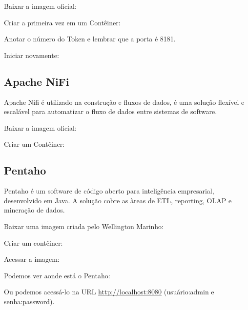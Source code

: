\documentclass[a4paper,11pt]{article}
\begin{document}
Baixar a imagem oficial: \\

Criar a primeira vez em um Contêiner: \\

Anotar o número do Token e lembrar que a porta é 8181. 

Iniciar novamente: \\

\subsection{Apache NiFi}
Apache Nifi é utilizado na construção e fluxos de dados, é uma solução flexível e escalável para automatizar o fluxo de dados entre sistemas de software. 

Baixar a imagem oficial: \\

Criar um Contêiner: \\

\subsection{Pentaho}
Pentaho é um software de código aberto para inteligência empresarial, desenvolvido em Java. A solução cobre as àreas de ETL, reporting, OLAP e mineração de dados. 

Baixar uma imagem criada pelo Wellington Marinho: \\

Criar um contêiner: \\

Acessar a imagem: \\

Podemos ver aonde está o Pentaho: \\

Ou podemos acessá-lo na URL \url{http://localhost:8080} (usuário:admin e senha:password).
\end{document}
